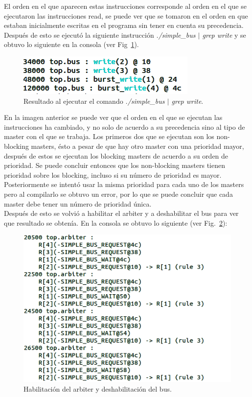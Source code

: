 \documentclass[twocolumn]{IEEEtran}
\begin{document}
\noindent
El orden en el que aparecen estas instrucciones corresponde al orden en el que se ejecutaron las instrucciones read, se puede ver que se tomaron en el orden en que estaban inicialmente escritas en el programa sin tener en cuenta su precedencia.\\
Después de esto se ejecutó la siguiente instrucción \textit{./simple\_bus $\mid$ grep write} y se obtuvo lo siguiente en  la consola (ver Fig~\ref{fig5}).
\begin{figure}[H]
  \centering
    \includegraphics[scale=0.5]{fig5.png}
  \caption{Resultado al ejecutar el comando \textit{./simple\_bus $\mid$ grep write}.}
 \label{fig5}
\end{figure}
\noindent
En la imagen anterior se puede ver que el orden en el que se ejecutan las instrucciones ha cambiado, y no solo de acuerdo a su precedencia sino al tipo de master con el que se trabaja. Los primeros dos que se ejecutan son los non-blocking masters, ésto a pesar de que hay otro master con una prioridad mayor, después de estos se ejecutan los blocking masters de acuerdo a su orden de prioridad. Se puede concluir entonces que los non-blocking masters tienen prioridad sobre los blocking, incluso si su número de prioridad es mayor.\\
Posteriormente se intentó usar la misma prioridad para cada uno de los masters pero al compilarlo se obtuvo un error, por lo que se puede concluir que cada master debe tener un número de prioridad única.\\
Después de esto se volvió a habilitar el arbiter y a deshabilitar el bus para ver que resultado se obtenía. En la consola se obtuvo lo siguiente (ver Fig.~\ref{fig6}):\\
\begin{figure}[H]
  \centering
    \includegraphics[scale=0.5]{fig6.png}
  \caption{Habilitación del arbiter y deshabilitación del bus.}
 \label{fig6}
\end{figure}
\end{document}

